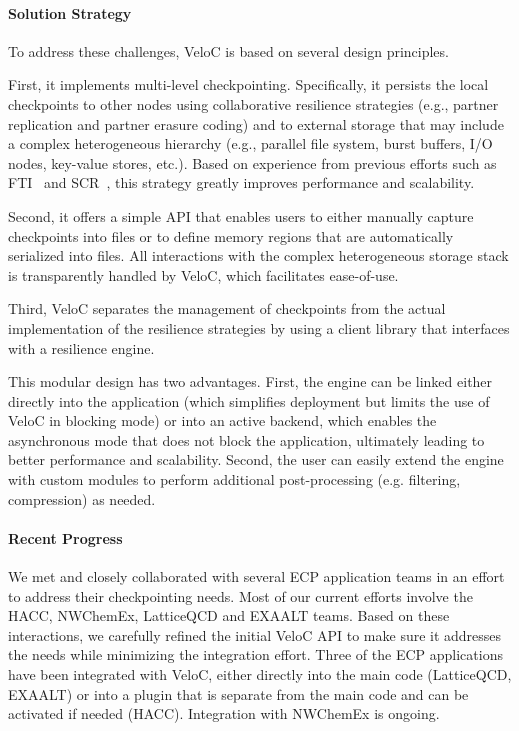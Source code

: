 \paragraph{Solution Strategy}

To address these challenges, VeloC is based on several design principles.

First, it implements multi-level checkpointing. Specifically, it
persists the local checkpoints to other nodes using collaborative
resilience strategies (e.g., partner replication and partner erasure
coding) and to external storage that may include a complex
heterogeneous hierarchy (e.g., parallel file system, burst buffers,
I/O nodes, key-value stores, etc.). Based on experience from previous
efforts such as FTI~\cite{FTI} and SCR~\cite{SCR}, this strategy
greatly improves performance and scalability.

Second, it offers a simple API that enables users to either manually
capture checkpoints into files or to define memory regions
that are automatically serialized into files. All interactions
with the complex heterogeneous storage stack is transparently handled
by VeloC, which facilitates ease-of-use.

Third, VeloC separates the management of checkpoints
from the actual implementation of the resilience strategies by
using a client library that interfaces with a resilience engine.

This modular design has two advantages. First, the engine
can be linked either directly into the application (which
simplifies deployment but limits the use of VeloC in blocking
mode) or into an active backend, which enables the asynchronous
mode that does not block the application, ultimately leading
to better performance and scalability. Second, the user can
easily extend the engine with custom modules to perform
additional post-processing (e.g. filtering, compression)
as needed.

\paragraph{Recent Progress}

We met and closely collaborated with several ECP application teams in
an effort to address their checkpointing needs. Most of our current
efforts involve the HACC, NWChemEx, LatticeQCD and EXAALT teams. Based
on these interactions, we carefully refined the initial VeloC API to
make sure it addresses the needs while minimizing the integration
effort. Three of the ECP applications have been integrated with VeloC,
either directly into the main code (LatticeQCD, EXAALT) or into
a plugin that is separate from the main code and can be activated
if needed (HACC). Integration with NWChemEx is ongoing.

